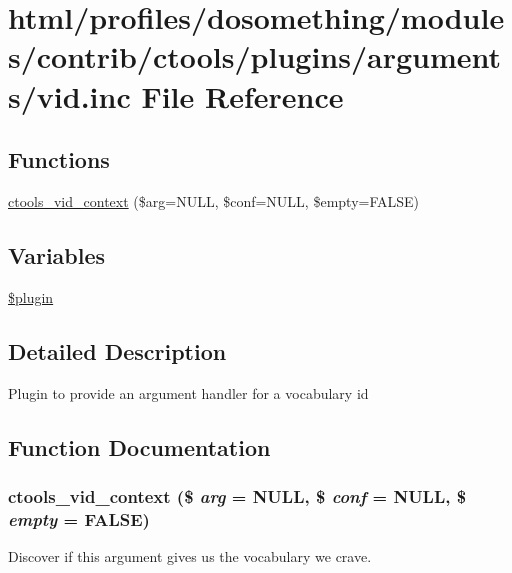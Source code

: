 \hypertarget{vid_8inc}{
\section{html/profiles/dosomething/modules/contrib/ctools/plugins/arguments/vid.inc File Reference}
\label{vid_8inc}
}
\subsection*{Functions}
\begin{DoxyCompactItemize}
\item 
\hyperlink{vid_8inc_a2a5387f432660aca048c3b47849f2872}{ctools\_\-vid\_\-context} (\$arg=NULL, \$conf=NULL, \$empty=FALSE)
\end{DoxyCompactItemize}
\subsection*{Variables}
\begin{DoxyCompactItemize}
\item 
\hyperlink{vid_8inc_ada8a7130088351710bb02ed622d6bf65}{\$plugin}
\end{DoxyCompactItemize}


\subsection{Detailed Description}
Plugin to provide an argument handler for a vocabulary id 

\subsection{Function Documentation}
\hypertarget{vid_8inc_a2a5387f432660aca048c3b47849f2872}{
\subsubsection[{ctools\_\-vid\_\-context}]{\setlength{\rightskip}{0pt plus 5cm}ctools\_\-vid\_\-context (\$ {\em arg} = {\ttfamily NULL}, \/  \$ {\em conf} = {\ttfamily NULL}, \/  \$ {\em empty} = {\ttfamily FALSE})}}
\label{vid_8inc_a2a5387f432660aca048c3b47849f2872}
Discover if this argument gives us the vocabulary we crave. 

